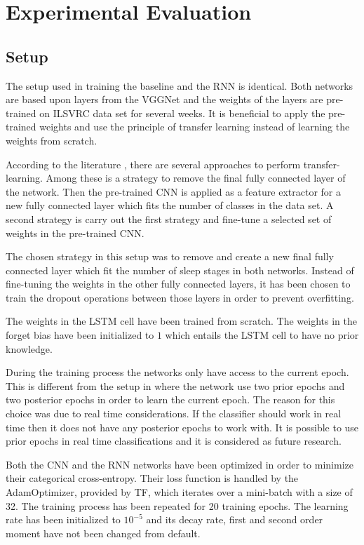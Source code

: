 \section{Experimental Evaluation}
\subsection{Setup}

The setup used in training the baseline and the RNN is identical. Both networks are based upon layers from the VGGNet and the weights of the layers are pre-trained on ILSVRC data set for several weeks. It is beneficial to apply the pre-trained weights and use the principle of transfer learning instead of learning the weights from scratch. 

According to the literature \cite{stand_cnn_notes_1}, there are several approaches to perform transfer-learning. Among these is a strategy to remove the final fully connected layer of the network. Then the pre-trained CNN is applied as a feature extractor for a new fully connected layer which fits the number of classes in the data set.
A second strategy is carry out the first strategy and fine-tune a selected set of weights in the pre-trained CNN.

The chosen strategy in this setup was to remove and create a new final fully connected layer which fit the number of sleep stages in both networks. Instead of fine-tuning the weights in the other fully connected layers, it has been chosen to train the dropout operations between those layers in order to prevent overfitting. 

The weights in the LSTM cell have been trained from scratch. The weights in the forget bias have been initialized to $1$ which entails the LSTM cell to have no prior knowledge.

During the training process the networks only have access to the current epoch. This is different from the setup in \cite{main_ar} where the network use two prior epochs and two posterior epochs in order to learn the current epoch. The reason for this choice was due to real time considerations. If the classifier should work in real time then it does not have any posterior epochs to work with. 
It is possible to use prior epochs in real time classifications and it is considered as future research.

Both the CNN and the RNN networks have been optimized in order to minimize their categorical cross-entropy. Their loss function is handled by the AdamOptimizer, provided by TF, which iterates over a mini-batch with a size of 32. 
The training process has been repeated for 20 training epochs. The learning rate has been initialized to $10^{-5}$ and its decay rate, first and second order moment have not been changed from default.

